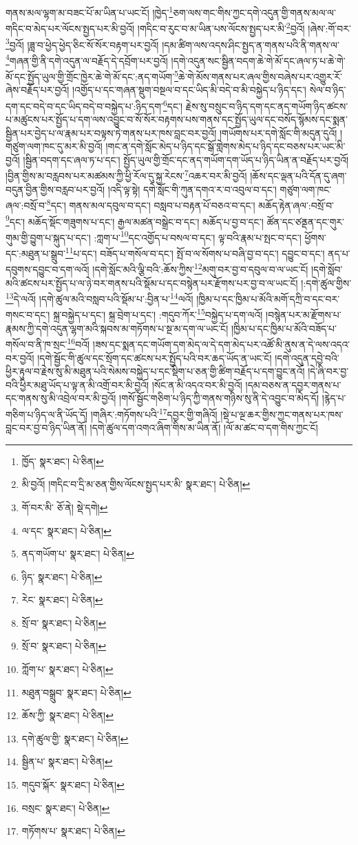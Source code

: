 གནས་མལ་ལྷག་མ་བཟང་པོ་མ་ཡིན་པ་ཡང་ངོ། །ཁྱེད་\footnote{ཁྱོད་  སྣར་ཐང་།  པེ་ཅིན། }ཅག་ལས་གང་གིས་ཀྱང་དགེ་འདུན་གྱི་གནས་མལ་ལ་གདིང་བ་མེད་པར་ལོངས་སྤྱད་པར་མི་བྱའོ། །གདིང་བ་རུང་བ་མ་ཡིན་པས་ལོངས་སྤྱད་པར་མི་\footnote{མི་བྱའོ། །གདིང་བ་དྲི་མ་ཅན་གྱིས་ལོངས་སྤྱད་པར་མི་  སྣར་ཐང་།  པེ་ཅིན། }བྱའོ། །ཞེས་:གོ་བར་\footnote{གོ་བར་མི་  ཅོ་ནེ།  སྡེ་དགེ། }བྱའོ། །ཟླ་བ་ཕྱེད་ཕྱེད་ཅིང་སོ་སོར་བརྟག་པར་བྱའོ། །དམ་ཚིག་ལས་འདས་ཤིང་སྤྱད་ན་གནས་པའི་ནི་གནས་ལ་\footnote{ལ་དང་  སྣར་ཐང་།  པེ་ཅིན། }གཞན་གྱི་ནི་དགེ་འདུན་ལ་བརྗོད་དེ་དབྲོག་པར་བྱའོ། །དགེ་འདུན་སང་སྦྱིན་བདག་ཆེ་གེ་མོ་དང་ཞལ་ཏ་པ་ཆེ་གེ་མོ་དང་སྤྱོད་ཡུལ་གྱི་གྲོང་ཁྱེར་ཆེ་གེ་མོ་དང་:ནད་གཡོག་\footnote{ནད་གཡོག་པ་  སྣར་ཐང་།  པེ་ཅིན། }ཆེ་གེ་མོས་གནས་པར་ཞལ་གྱིས་བཞེས་པར་འགྱུར་རོ་ཞེས་བརྗོད་པར་བྱའོ། །འགྱོད་པ་དང་གཞན་སྡུག་བསྔལ་བ་དང་ཡིད་མི་བདེ་བ་མི་བསྐྱེད་པ་ཉིད་དང་། སེལ་བ་ཉིད་དག་དང་བདེ་བ་དང་ཡིད་བདེ་བ་བསྐྱེད་པ་:ཉིད་དག་\footnote{ཉིད་  སྣར་ཐང་།  པེ་ཅིན། }དང་། རྗེས་སུ་བསྲུང་བ་ཉིད་དག་དང་ནད་གཡོག་ཉིད་ཚངས་པ་མཚུངས་པར་སྤྱོད་པ་དག་ལས་འབྱུང་བ་སོ་སོར་བརྟགས་པས་གནས་དང་སྤྱོད་ཡུལ་དང་བསོད་སྙོམས་དང་སྨན་སྦྱིན་པར་བྱེད་པ་ལ་རྣམ་པར་བལྟས་ཏེ་གནས་པར་ཁས་བླང་བར་བྱའོ། །གཡོགས་པར་དགེ་སློང་གི་མདུན་དུའོ། །གཙུག་ལག་ཁང་དུ་མར་མི་བྱའོ། །གང་ན་དགེ་སློང་མེད་པ་ཉིད་དང་སྒོ་གླེགས་མེད་པ་ཉིད་དང་བཅས་པར་ཡང་མི་བྱའོ། །སྦྱིན་བདག་དང་ཞལ་ཏ་པ་དང་། སྤྱོད་ཡུལ་གྱི་གྲོང་དང་ནད་གཡོག་དག་ཡོད་པ་ཉིད་ཡིན་ན་བརྗོད་པར་བྱའོ། །བྱིན་གྱིས་མ་བརླབས་པར་མཚམས་ཀྱི་ཕྱི་རོལ་དུ་སྐྱ་རེངས་\footnote{རེང་  སྣར་ཐང་།  པེ་ཅིན། }འཆར་བར་མི་བྱའོ། །ཆོས་དང་ལྡན་པའི་དོན་དུ་ཞག་བདུན་བྱིན་གྱིས་བརླབ་པར་བྱའོ། །འདི་ལྟ་སྟེ། དགེ་སློང་གི་ཀུན་དགའ་ར་བ་འབུལ་བ་དང་། གཙུག་ལག་ཁང་ཞལ་:བསྲོ་བ་\footnote{སྲོ་བ་  སྣར་ཐང་།  པེ་ཅིན། }དང་། གནས་མལ་དབུལ་བ་དང་། བསླབ་པ་བརྟན་པོ་བཅའ་བ་དང་། མཆོད་རྟེན་ཞལ་:བསྲོ་བ་\footnote{སྲོ་བ་  སྣར་ཐང་།  པེ་ཅིན། }དང་། མཆོད་སྡོང་གཟུགས་པ་དང་། རྒྱལ་མཚན་བསྒྲེང་བ་དང་། མཆོད་པ་བྱ་བ་དང་། ཚོན་དང་ཙནྡན་དང་གུར་གུམ་གྱི་བྱུག་པ་སྐུད་པ་དང་། :ཀླག་པ་\footnote{ཀློག་པ་  སྣར་ཐང་།  པེ་ཅིན། }དང་འགྱོད་པ་བསལ་བ་དང་། ལྟ་བའི་རྣམ་པ་སྤང་བ་དང་། ཕྱོགས་དང་:མཐུན་པ་སྒྲུབ་\footnote{མཐུན་བསྒྲུབ་  སྣར་ཐང་།  པེ་ཅིན། }པ་དང་། བཟོད་པ་གསོལ་བ་དང་། སྤོ་བ་ལ་སོགས་པ་བཞི་བྱ་བ་དང་། དབྱུང་བ་དང་། ནད་པ་དབུགས་དབྱུང་བ་དག་ལའོ། །དགེ་སློང་མའི་ལྕི་བའི་:ཆོས་ཀྱིས་\footnote{ཆོས་ཀྱི་  སྣར་ཐང་།  པེ་ཅིན། }མགུ་བར་བྱ་བ་དབུལ་བ་ལ་ཡང་ངོ། །དགེ་སློབ་མའི་ཚངས་པར་སྤྱོད་པ་ལ་ཉེ་བར་གནས་པའི་སྡོམ་པ་དང་བསྙེན་པར་རྫོགས་པར་བྱ་བ་ལ་ཡང་ངོ། །:དགེ་ཚུལ་གྱིས་\footnote{དགེ་ཚུལ་གྱི་  སྣར་ཐང་།  པེ་ཅིན། }དེ་ལའོ། །དགེ་ཚུལ་མའི་བསླབ་པའི་སྡོམ་པ་:བྱིན་པ་\footnote{སྦྱིན་པ་  སྣར་ཐང་།  པེ་ཅིན། }ལའོ། །ཁྱིམ་པ་དང་ཁྱིམ་པ་མོའི་མགོ་དཀྲི་བ་དང་བར་གསང་བ་དང་། སྐྲ་བསྐྱེད་པ་དང་། སྐྲ་བྲེག་པ་དང་། :གདུབ་ཀོར་\footnote{གདུབ་སྐོར་  སྣར་ཐང་།  པེ་ཅིན། }བསྐྱེད་པ་དག་ལའོ། །བསྙེན་པར་མ་རྫོགས་པ་རྣམས་ཀྱི་དགེ་འདུན་ལྷག་མའི་སྐབས་མ་གཏོགས་པ་སྔ་མ་དག་ལ་ཡང་ངོ། །ཁྱིམ་པ་དང་ཁྱིམ་པ་མོའི་བཟོད་པ་གསོལ་བ་ནི་ཁ་སྲང་\footnote{བསྲང་  སྣར་ཐང་།  པེ་ཅིན། }བའོ། །ཟས་དང་སྨན་དང་གཡོག་དག་མེད་ལ་དེ་དག་མེད་པར་འཚོ་མི་ནུས་ན་དེ་ལས་འདའ་བར་བྱའོ། །དགེ་སྦྱོང་གི་ཚུལ་དང་སྲོག་དང་ཚངས་པར་སྤྱོད་པའི་བར་ཆད་ཡོད་ན་ཡང་ངོ། །དགེ་འདུན་དབྱེ་བའི་ཕྱིར་རྟུལ་བ་རྗེས་སུ་མི་མཐུན་པའི་སེམས་བསྐྱེད་པ་དང་སྡིག་པ་ཅན་གྱི་ཚིག་བརྗོད་པ་དག་བྱུང་ནའོ། །དེ་ཞི་བར་བྱ་བའི་ཕྱིར་མཐུ་ཡོད་པ་ལྟ་ན་མི་འགྲོ་བར་མི་བྱའོ། །སོང་ན་མི་འདའ་བར་མི་བྱའོ། །དམ་བཅས་ན་དབྱར་གནས་པ་དང་གནས་སུ་མི་འབྲེལ་བར་མི་བྱའོ། །གསོ་སྦྱོང་གཅིག་པ་ཉིད་ཀྱི་གནས་གཉིས་སུ་ནི་དེ་འབྱུང་བ་མེད་དོ། །རྙེད་པ་གཅིག་པ་ཉིད་ལ་ནི་ཡོད་དོ། །གཞིར་:གཏོགས་པའི་\footnote{གཏོགས་པ་  སྣར་ཐང་།  པེ་ཅིན། }དབྱར་གྱི་གཞིའོ། །སྡེ་པ་ལྔ་ཆར་གྱིས་ཀྱང་གནས་པར་ཁས་བླང་བར་བྱ་བ་ཉིད་ཡིན་ནོ། །དགེ་ཚུལ་དག་འགའ་ཞིག་གིས་མ་ཡིན་ནོ། །ལོ་མ་ཚང་བ་དག་གིས་ཀྱང་ངོ། 